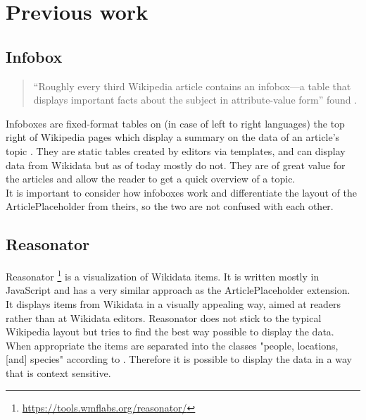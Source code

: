 \chapter{Previous work}
\section{Infobox} \label{infobox}
\begin{quote}
	``Roughly every third Wikipedia article contains an infobox---a table that displays important facts about the subject in attribute-value form'' found \citet[5]{infobox}.
\end{quote}
Infoboxes are fixed-format tables on (in case of left to right languages) the top right of Wikipedia pages which display a summary on the data of an article's topic \citep{wiki:05}. They are static tables created by editors via templates, and can display data from Wikidata but as of today mostly do not. They are of great value for the articles and allow the reader to get a quick overview of a topic. \\
It is important to consider how infoboxes work and differentiate the layout of the ArticlePlaceholder from theirs, so the two are not confused with each other.

\section{Reasonator}
Reasonator \footnote{\url{https://tools.wmflabs.org/reasonator/}} is a visualization of Wikidata items. It is written mostly in JavaScript and has a very similar approach as the ArticlePlaceholder extension. It displays items from Wikidata in a visually appealing way, aimed at readers rather than at Wikidata editors. Reasonator does not stick to the typical Wikipedia layout but tries to find the best way possible to display the data. \\
When appropriate the items are separated into the classes  "people, locations, [and] species" according to \citet{wiki:06}. Therefore it is possible to display the data in a way that is context sensitive. \\

